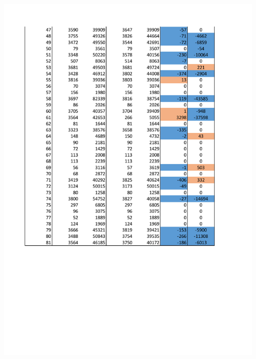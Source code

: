 \documentclass[10pt]{scrreprt}
\begin{document}
\begin{center}
    \includegraphics[scale = 0.8]{pictures/results2.pdf}
\end{center}
\end{document}
